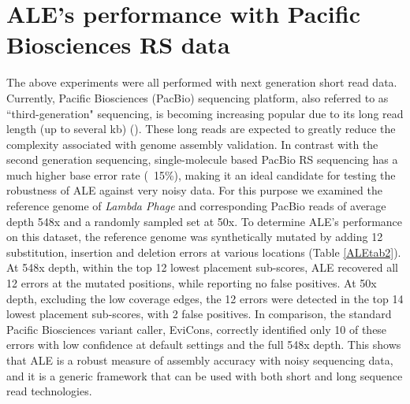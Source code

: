 \documentclass[phd,tocprelim]{cornell}
\begin{document}
\section{ALE's performance with Pacific Biosciences RS data}
The above experiments were all performed with next generation short read data. Currently, Pacific Biosciences (PacBio) sequencing platform, also referred to as ``third-generation" sequencing, is becoming increasing popular due to its long read length (up to several kb) (\cite{Eid2009}). These long reads are expected to greatly reduce the complexity associated with genome assembly validation. In contrast with the second generation sequencing, single-molecule based PacBio RS sequencing has a much higher base error rate (~15\%), making it an ideal candidate for testing the robustness of ALE against very noisy data. For this purpose we examined the reference genome of {\it Lambda Phage} and corresponding PacBio reads of average depth 548x and a randomly sampled set at 50x. To determine ALE's performance on this dataset, the reference genome was synthetically mutated by adding 12 substitution, insertion and deletion errors at various locations (Table \ref{ALEtab2}). At 548x depth, within the top 12 lowest placement sub-scores, ALE recovered all 12 errors at the mutated positions, while reporting no false positives. At 50x depth, excluding the low coverage edges, the 12 errors were detected in the top 14 lowest placement sub-scores, with 2 false positives.  In comparison, the standard Pacific Biosciences variant caller, EviCons, correctly identified only 10 of these errors with low confidence at default settings and the full 548x depth. This shows that ALE is a robust measure of assembly accuracy with noisy sequencing data, and it is a generic framework that can be used with both short and long sequence read technologies.
\end{document}
